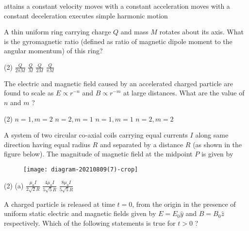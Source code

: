 \begin{enumerate}
\begin{tasks}
	\task[\textbf{A.}] attains a constant velocity
	\task[\textbf{B.}] moves with a constant acceleration
	\task[\textbf{C.}] moves with a constant deceleration
	\task[\textbf{D.}]executes simple harmonic motion
\end{tasks}
\begin{minipage}{\textwidth}
	\item A thin uniform ring carrying charge $Q$ and mass $M$ rotates about its axis. What is the gyromagnetic ratio (defined as ratio of magnetic dipole moment to the angular momentum) of this ring?
\end{minipage}
\begin{tasks}(2)
	\task[\textbf{A.}] $\frac{Q}{2 \pi M}$
	\task[\textbf{B.}]$\frac{Q}{M}$
	\task[\textbf{C.}]$\frac{Q}{2 M}$
	\task[\textbf{D.}]$\frac{Q}{\pi M}$
\end{tasks}
\begin{minipage}{\textwidth}
	\item The electric and magnetic field caused by an accelerated charged particle are found to scale as $E \propto r^{-n}$ and $B \propto r^{-m}$ at large distances. What are the value of $n$ and $m$ ?
\end{minipage}
\begin{tasks}(2)
	\task[\textbf{A.}] $n=1, m=2$
	\task[\textbf{B.}] $n=2, m=1$
	\task[\textbf{C.}]$n=1, m=1$
	\task[\textbf{D.}]$n=2, m=2$
\end{tasks}
\begin{minipage}{\textwidth}
	\item A system of two circular co-axial coils carrying equal currents $I$ along same direction having equal radius $R$ and separated by a distance $R$ (as shown in the figure below). The magnitude of magnetic field at the midpoint $P$ is given by
	\begin{figure}[H]
		\centering
		\texttt{[image: diagram-20210809(7)-crop]}
		\caption{}
		\label{}
	\end{figure}
\end{minipage}
\begin{tasks}(2)
	\task[\textbf{A.}](a) $\frac{\mu_{0} I}{2 \sqrt{2} R}$
	\task[\textbf{B.}]$\frac{4 \mu_{0} I}{5 \sqrt{5} R}$
	\task[\textbf{C.}]$\frac{8 \mu_{0} I}{5 \sqrt{5} R}$
\end{tasks}
\begin{minipage}{\textwidth}
	\item A charged particle is released at time $t=0$, from the origin in the presence of uniform static electric and magnetic fields given by $E=E_{0} \hat{y}$ and $B=B_{0} \hat{z}$ respectively. Which of the following statements is true for $t>0$ ?

\end{minipage}
\end{enumerate}
